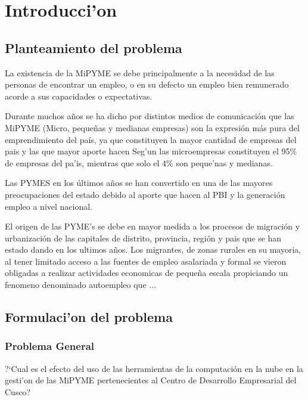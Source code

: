 %
%

\chapter{Introducci'on}

\section{Planteamiento del problema}
La existencia de la MiPYME se debe principalmente a la necesidad de las personas
de encontrar un empleo, o en su defecto un empleo bien remunerado acorde a sus
capacidades o expectativas.

Durante muchos a\~nos se ha dicho por distintos medios de comunicaci\'on que
las MiPYME (Micro, peque\~nas y medianas empresas) son la expresi\'on m\'as pura
del emprendimiento del pa\'is, ya que constituyen la mayor cantidad de empresas
del pais y las que mayor aporte hacen
Seg'un \citep{produce} las microempresas constituyen el 95\% de empresas del
pa'is, mientras que solo el 4\% son peque'nas y medianas.

Las PYMES en los \'ultimos a\~nos se han convertido en una de las mayores
preocupaciones del estado debido al aporte que hacen al PBI y la
generaci\'on empleo a nivel nacional\citep{arbulu}.

El origen de las PYME's se debe en mayor medida a los procesos de
migraci\'on y urbanizaci\'on de las capitales de distrito, provincia,
regi\'on y pais que se han estado dando en los ultimos a\~nos. Los
migrantes, de zonas rurales en su mayoria, al tener limitado acceso
a las fuentes de empleo asalariada y formal se vieron obligadas a
realizar actividades economicas de peque\~na escala propiciando un
fenomeno denominado autoempleo que ...
\section{Formulaci'on del problema}
\subsection{Problema General}
?`Cual es el efecto del uso de las herramientas de la computaci\'on en la nube
en la gesti'on de las MiPYME pertenecientes al Centro de Desarrollo Empresarial
del Cusco?
